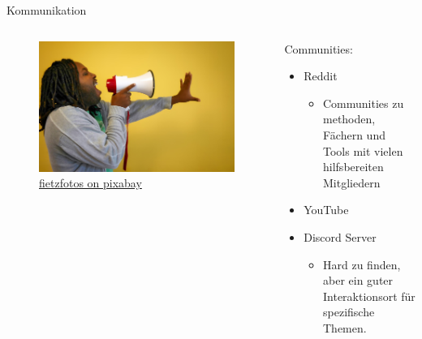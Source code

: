 \begin{frame}{Kommunikation}
    \begin{columns}[t]
        \begin{column}{0.4\textwidth}
            \vspace{-2em} 
            \begin{figure}
                \begin{flushleft}
                    \includegraphics[height=0.8\textheight,trim={4cm 0 17cm 0},clip]{graphics/call-2946023_1280.jpg}
                    \caption*{\href{https://pixabay.com/photos/call-afro-megaphone-scream-symbol-2946023/}{fietzfotos on pixabay}}    
                \end{flushleft}                
            \end{figure}            
        \end{column}
        \begin{column}{0.6\textwidth}
            Communities:
            \begin{itemize}
                \item Reddit 
                \begin{itemize}
                    \item Communities zu methoden, Fächern und Tools mit vielen hilfsbereiten Mitgliedern
                \end{itemize} 
                \item YouTube 
                \item Discord Server
                \begin{itemize}
                    \item Hard zu finden, aber ein guter Interaktionsort für spezifische Themen.
                \end{itemize}        
            \end{itemize}
        \end{column}
    \end{columns}
\end{frame}